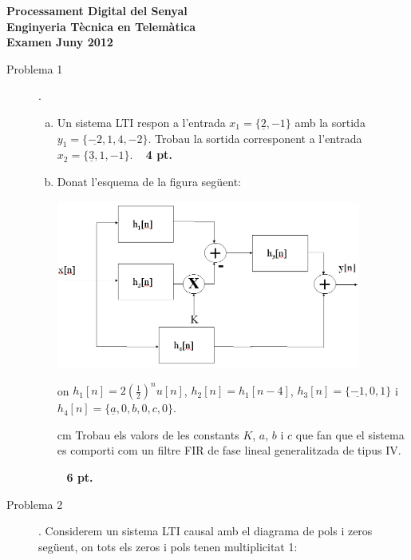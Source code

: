 \documentclass{article}
\begin{document}
\begin{center}
\textbf{\Large Processament Digital del Senyal \\ Enginyeria Tècnica en Telemàtica \\ Examen Juny 2012}
\end{center}

\begin{description}

\item[Problema 1]. 

\begin{enumerate}[a)]

\item Un sistema LTI respon a l'entrada $x_1=\{\underline{2}, -1\}$ amb la sortida $y_1=\{\underline{-2}, 1, 4, -2\}$.
Trobau la sortida corresponent a l'entrada $x_2=\{\underline{3}, 1, -1\}$.
\ \hfill{\textbf{ 4 pt.}}

\item Donat l'esquema de la figura següent:

\begin{center}
\includegraphics[width=10cm]{esquemaP1.png}
\end{center}

\noindent
on $h_1[n]=2 (\frac{1}{2})^n u[n]$, $h_2[n]=h_1[n-4]$, $h_3[n]=\{ \underline{-1}, 0, 1 \}$
i $h_4[n]=\{ \underline{a}, 0, b, 0, c, 0 \}$.

 cm
\noindent
Trobau els valors de les constants $K$, $a$, $b$ i $c$ que fan que el sistema es comporti com
un filtre FIR de fase lineal generalitzada de tipus IV.

\ \hfill{\textbf{ 6 pt.}}

\end{enumerate}

\vskip 0.5cm


\item[Problema 2].
Considerem un sistema LTI causal amb el diagrama de pols i zeros següent, on tots els zeros i pols tenen multiplicitat 1:


\end{description}
\end{document}

